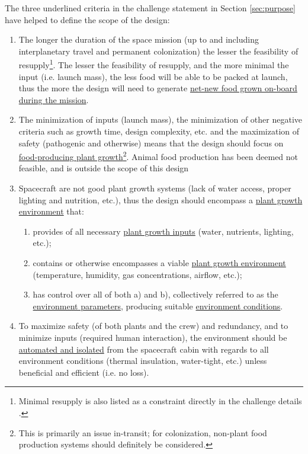 \documentclass{../tex/report}
\begin{document}
The three underlined criteria in the challenge statement in Section \ref{sec:purpose} have helped to define the scope of the design:
\begin{enumerate}[label=SC\arabic*., ref=SC\arabic*]
    \item \label{sc:1} The longer the duration of the space mission (up to and including interplanetary travel and permanent colonization) the lesser the feasibility of resupply\footnote{Minimal resupply is also listed as a constraint directly in the challenge details \cite{applicantguide,dsfc-phase2}.}. The lesser the feasibility of resupply, and the more minimal the input (i.e. launch mass), the less food will be able to be packed at launch, thus the more the design will need to generate \uline{net-new food grown on-board during the mission}.
    \item \label{sc:2} The minimization of inputs (launch mass), the minimization of other negative criteria such as growth time, design complexity, etc. and the maximization of safety (pathogenic and otherwise) means that the design should focus on \uline{food-producing plant growth}\footnote{This is primarily an issue in-transit; for colonization, non-plant food production systems should definitely be considered.}. Animal food production has been deemed not feasible, and is outside the scope of this design
    \item \label{sc:3} Spacecraft are not good plant growth systems (lack of water access, proper lighting and nutrition, etc.), thus the design should encompass a \uline{plant growth environment} that:
        \begin{enumerate}[label=SC3\alph*., ref=SC3\alph*]
            \item \label{sc:3a} provides of all necessary \uline{plant growth inputs} (water, nutrients, lighting, etc.);
            \item \label{sc:3b} contains or otherwise encompasses a viable \uline{plant growth environment} (temperature, humidity, gas concentrations, airflow, etc.);
            \item \label{sc:3c} has control over all of both a) and b), collectively referred to as the \uline{environment parameters}, producing suitable \uline{environment conditions}.
        \end{enumerate}
    \item \label{sc:4} To maximize safety (of both plants and the crew) and redundancy, and to minimize inputs (required human interaction), the environment should be \uline{automated and isolated} from the spacecraft cabin with regards to all environment conditions (thermal insulation, water-tight, etc.) unless beneficial and efficient (i.e. no loss).

\end{enumerate}
\end{document}
